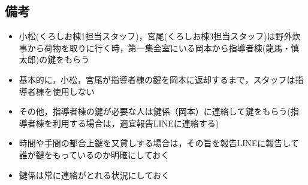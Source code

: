 \subsection{備考}
\begin{itemize}
\item 小松(くろしお棟1担当スタッフ)，宮尾(くろしお棟3担当スタッフ)は野外炊事から荷物を取りに行く時，第一集会室にいる岡本から指導者棟(龍馬・慎太郎)の鍵をもらう
\item 基本的に，小松，宮尾が指導者棟の鍵を岡本に返却するまで，スタッフは指導者棟を使用しない
\item その他，指導者棟の鍵が必要な人は鍵係（岡本）に連絡して鍵をもらう(指導者棟を利用する場合は，適宜報告LINEに連絡する)
\item 時間や手間の都合上鍵を又貸しする場合は，その旨を報告LINEに報告して誰が鍵をもっているのか明確にしておく
\item 鍵係は常に連絡がとれる状況にしておく
\end{itemize}


%
